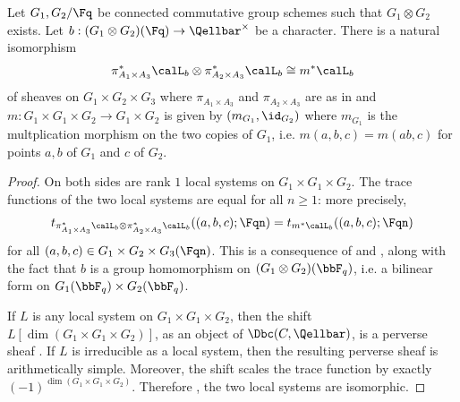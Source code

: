 \begin{lemma} \label{lemma:pullbacks_of_kummer_sheaves_of_characters_on_a_tensor_product_of_commutative_group_schemes_over_a_finite_field}
    Let $G_1,G_2/\Fq$ be connected commutative group schemes such that $G_1 \otimes G_2$ exists. Let $b: (G_1 \otimes G_2)(\Fq) \to \Qellbar^\times$ be a character. There is a natural isomorphism
    $$\pi_{A_1 \times A_3}^* \calL_b \otimes \pi_{A_2 \times A_3}^* \calL_b \cong m^* \calL_b$$
     of sheaves on $G_1 \times G_2 \times G_3$ 
    where $\pi_{A_1 \times A_3}$ and $\pi_{A_2 \times A_3}$ are as in  and $m: G_1 \times G_1 \times G_2 \to G_1 \times G_2$ is given by $(m_{G_1}, \id_{G_2})$ where $m_{G_1}$ is the multplication morphism on the two copies of $G_1$, i.e. $m(a,b,c) = m(ab,  c)$ for points $a,b$ of $G_1$ and $c$ of $G_2$.
\end{lemma}
\begin{proof}
    On both sides are rank $1$ local systems on $G_1 \times G_1 \times G_2$. The trace functions of the two local systems are equal for all $n \geq 1$: more precisely,
    $$t_{\pi_{A_1 \times A_3}^* \calL_b \otimes \pi_{A_2 \times A_3}^* \calL_b}((a,b,c);\Fqn) = t_{m^* \calL_b}((a,b,c);\Fqn)$$
    for all $(a,b,c) \in G_1 \times G_2 \times G_3(\Fqn)$. This is a consequence of  and , along with the fact that $b$ is a group homomorphism on $(G_1 \otimes G_2)(\bbF_q)$, i.e. a bilinear form on $G_1(\bbF_q) \times G_2(\bbF_q)$. 

    If $L$ is any local system on $G_1 \times G_1 \times G_2$, then the shift $L[\dim(G_1 \times G_1 \times G_2)]$, as an object of $\Dbc(C, \Qellbar)$, is a perverse sheaf . If $L$ is irreducible as a local system, then the resulting perverse sheaf is arithmetically simple. Moreover, the shift scales the trace function by exactly $(-1)^{\dim(G_1 \times G_1 \times G_2)}$. Therefore , the two local systems are isomorphic.
\end{proof}

